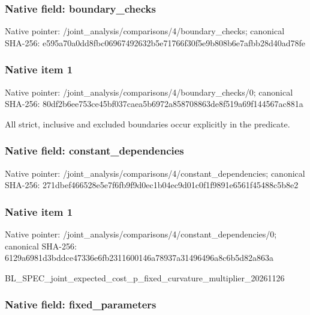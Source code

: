 \documentclass[10pt,a4paper]{article}
\begin{document}
\subsubsection{Native field: boundary\_checks}


Native pointer: /joint\_analysis/comparis\allowbreak{}ons/4/boundary\_checks; canonical SHA-256: e595a70a0dd8fbc069674926\allowbreak{}32b5e71766f30f5e9b808b6e\allowbreak{}7afbb28d40ad78fe



\subsubsection{Native item 1}


Native pointer: /joint\_analysis/comparis\allowbreak{}ons/4/boundary\_checks/0; canonical SHA-256: 80df2b6ee753ce45bf037cae\allowbreak{}a5b6972a858708863de8f519\allowbreak{}a69f144567ac881a


All strict, inclusive and excluded boundaries occur explicitly in the predicate.


\subsubsection{Native field: constant\_dependencies}


Native pointer: /joint\_analysis/comparis\allowbreak{}ons/4/constant\_dependenc\allowbreak{}ies; canonical SHA-256: 271dbef466528e5e7f6fb9f9\allowbreak{}d0ec1b04ec9d01c0f1f9891e\allowbreak{}6561f45488c5b8e2



\subsubsection{Native item 1}


Native pointer: /joint\_analysis/comparis\allowbreak{}ons/4/constant\_dependenc\allowbreak{}ies/0; canonical SHA-256: 6129a6981d3bddce47336e6f\allowbreak{}b2311600146a78937a314964\allowbreak{}96a8c6b5d82a863a


BL\_SPEC\_joint\_expected\_c\allowbreak{}ost\_p\_fixed\_curvature\_mu\allowbreak{}ltiplier\_20261126


\subsubsection{Native field: fixed\_parameters}
\end{document}
